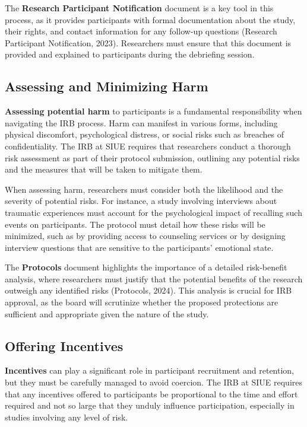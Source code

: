 \documentclass[
]{book}
\begin{document}
The \textbf{Research Participant Notification} document is a key tool in this process, as it provides participants with formal documentation about the study, their rights, and contact information for any follow-up questions (Research Participant Notification, 2023). Researchers must ensure that this document is provided and explained to participants during the debriefing session.

\subsection*{Assessing and Minimizing Harm}\label{assessing-and-minimizing-harm}

\textbf{Assessing potential harm} to participants is a fundamental responsibility when navigating the IRB process. Harm can manifest in various forms, including physical discomfort, psychological distress, or social risks such as breaches of confidentiality. The IRB at SIUE requires that researchers conduct a thorough risk assessment as part of their protocol submission, outlining any potential risks and the measures that will be taken to mitigate them.

When assessing harm, researchers must consider both the likelihood and the severity of potential risks. For instance, a study involving interviews about traumatic experiences must account for the psychological impact of recalling such events on participants. The protocol must detail how these risks will be minimized, such as by providing access to counseling services or by designing interview questions that are sensitive to the participants' emotional state.

The \textbf{Protocols} document highlights the importance of a detailed risk-benefit analysis, where researchers must justify that the potential benefits of the research outweigh any identified risks (Protocols, 2024). This analysis is crucial for IRB approval, as the board will scrutinize whether the proposed protections are sufficient and appropriate given the nature of the study.

\subsection*{Offering Incentives}\label{offering-incentives}

\textbf{Incentives} can play a significant role in participant recruitment and retention, but they must be carefully managed to avoid coercion. The IRB at SIUE requires that any incentives offered to participants be proportional to the time and effort required and not so large that they unduly influence participation, especially in studies involving any level of risk.
\end{document}
